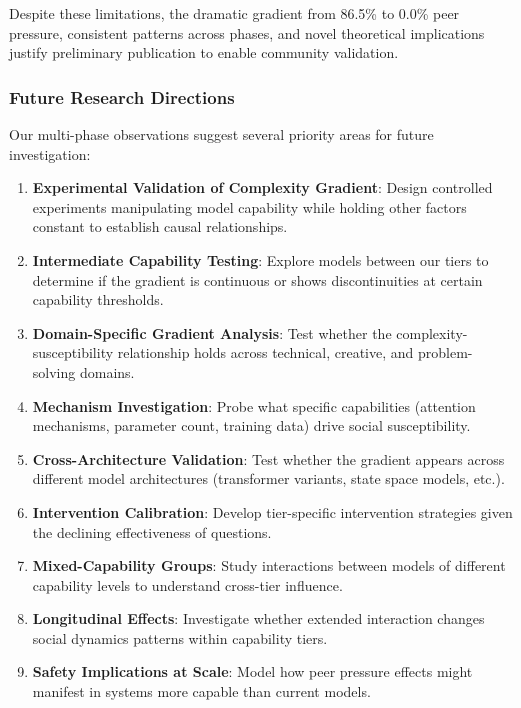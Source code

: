 \documentclass[11pt,letterpaper]{article}
\newcommand{\exponedataPeerPressurePercentage}{86.5\%}
\newcommand{\expthreePeerPressurePercentage}{0.0\%}
\begin{document}
Despite these limitations, the dramatic gradient from \exponedataPeerPressurePercentage{} to \expthreePeerPressurePercentage{} peer pressure, consistent patterns across phases, and novel theoretical implications justify preliminary publication to enable community validation.

\subsubsection{Future Research Directions}

Our multi-phase observations suggest several priority areas for future investigation:

\begin{enumerate}
    \item \textbf{Experimental Validation of Complexity Gradient}: Design controlled experiments manipulating model capability while holding other factors constant to establish causal relationships.
    
    \item \textbf{Intermediate Capability Testing}: Explore models between our tiers to determine if the gradient is continuous or shows discontinuities at certain capability thresholds.
    
    \item \textbf{Domain-Specific Gradient Analysis}: Test whether the complexity-susceptibility relationship holds across technical, creative, and problem-solving domains.
    
    \item \textbf{Mechanism Investigation}: Probe what specific capabilities (attention mechanisms, parameter count, training data) drive social susceptibility.
    
    \item \textbf{Cross-Architecture Validation}: Test whether the gradient appears across different model architectures (transformer variants, state space models, etc.).
    
    \item \textbf{Intervention Calibration}: Develop tier-specific intervention strategies given the declining effectiveness of questions.
    
    \item \textbf{Mixed-Capability Groups}: Study interactions between models of different capability levels to understand cross-tier influence.
    
    \item \textbf{Longitudinal Effects}: Investigate whether extended interaction changes social dynamics patterns within capability tiers.
    
    \item \textbf{Safety Implications at Scale}: Model how peer pressure effects might manifest in systems more capable than current models.
\end{enumerate}
\end{document}
